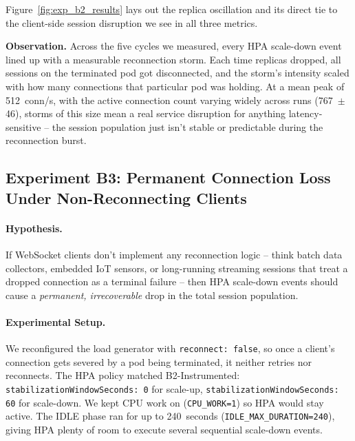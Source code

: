 \documentclass[pdflatex,sn-mathphys-num]{sn-jnl}
\theoremstyle{thmstyleone}%
\theoremstyle{thmstyletwo}%
\theoremstyle{thmstylethree}%
\begin{document}
Figure~\ref{fig:exp_b2_results} lays out the replica oscillation and its direct
tie to the client-side session disruption we see in all three metrics.

\noindent\textbf{Observation.} Across the five cycles we measured, every HPA
scale-down event lined up with a measurable reconnection storm. Each time replicas
dropped, all sessions on the terminated pod got disconnected, and the storm's
intensity scaled with how many connections that particular pod was holding. At a
mean peak of 512~conn/s, with the active connection count varying widely across
runs (767~$\pm$46), storms of this size mean a real service disruption for
anything latency-sensitive -- the session population just isn't stable or
predictable during the reconnection burst.

\subsection{Experiment B3: Permanent Connection Loss Under Non-Reconnecting Clients}
\label{sec:b3}

\paragraph{Hypothesis.} If WebSocket clients don't implement any reconnection
logic -- think batch data collectors, embedded IoT sensors, or long-running
streaming sessions that treat a dropped connection as a terminal failure -- then
HPA scale-down events should cause a \textit{permanent, irrecoverable} drop in the
total session population.

\paragraph{Experimental Setup.} We reconfigured the load generator with
\texttt{reconnect: false}, so once a client's connection gets severed by a pod
being terminated, it neither retries nor reconnects. The HPA policy matched
B2-Instrumented: \texttt{stabilizationWindowSeconds: 0} for scale-up,
\texttt{stabilizationWindowSeconds: 60} for scale-down. We kept CPU work on
(\texttt{CPU\_WORK=1}) so HPA would stay active. The IDLE phase ran for up to
240~seconds (\texttt{IDLE\_MAX\_DURATION=240}), giving HPA plenty of room to
execute several sequential scale-down events.
\end{document}
